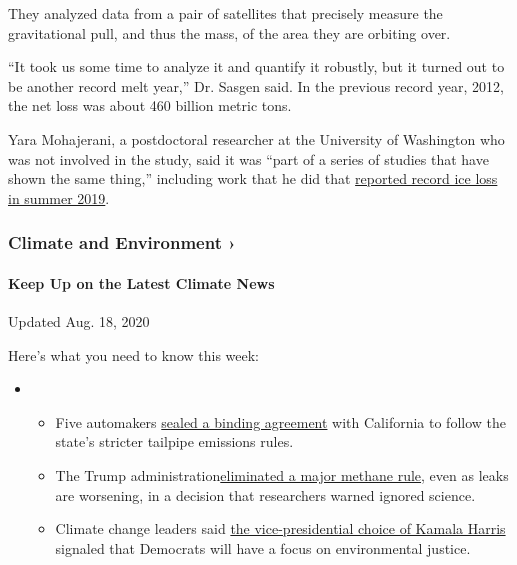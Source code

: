 They analyzed data from a pair of satellites that precisely measure the
gravitational pull, and thus the mass, of the area they are orbiting
over.

``It took us some time to analyze it and quantify it robustly, but it
turned out to be another record melt year,'' Dr. Sasgen said. In the
previous record year, 2012, the net loss was about 460 billion metric
tons.

Yara Mohajerani, a postdoctoral researcher at the University of
Washington who was not involved in the study, said it was ``part of a
series of studies that have shown the same thing,'' including work that
he did that
\href{https://agupubs.onlinelibrary.wiley.com/doi/abs/10.1029/2020GL087291}{reported
record ice loss in summer 2019}.

\href{https://www.nytimes3xbfgragh.onion/section/climate?action=click\&pgtype=Article\&state=default\&region=MAIN_CONTENT_1\&context=storylines_keepup}{}

\hypertarget{climate-and-environment-}{%
\subsubsection{Climate and Environment
›}\label{climate-and-environment-}}

\hypertarget{keep-up-on-the-latest-climate-news}{%
\paragraph{Keep Up on the Latest Climate
News}\label{keep-up-on-the-latest-climate-news}}

Updated Aug. 18, 2020

Here's what you need to know this week:

\begin{itemize}
\item
  \begin{itemize}
  \tightlist
  \item
    Five automakers
    \href{https://www.nytimes3xbfgragh.onion/2020/08/17/climate/california-automakers-pollution.html?action=click\&pgtype=Article\&state=default\&region=MAIN_CONTENT_1\&context=storylines_keepup}{sealed
    a binding agreement} with California to follow the state's stricter
    tailpipe emissions rules.
  \item
    The Trump
    administration\href{https://www.nytimes3xbfgragh.onion/2020/08/13/climate/trump-methane.html?action=click\&pgtype=Article\&state=default\&region=MAIN_CONTENT_1\&context=storylines_keepup}{eliminated
    a major methane rule}, even as leaks are worsening, in a decision
    that researchers warned ignored science.
  \item
    Climate change leaders said
    \href{https://www.nytimes3xbfgragh.onion/2020/08/12/climate/kamala-harris-environmental-justice.html?action=click\&pgtype=Article\&state=default\&region=MAIN_CONTENT_1\&context=storylines_keepup}{the
    vice-presidential choice of Kamala Harris} signaled that Democrats
    will have a focus on environmental justice.
  \end{itemize}
\end{itemize}

